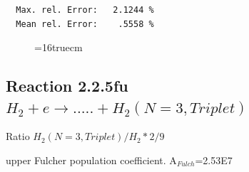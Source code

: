\documentclass[12pt,dvips]{article}
\begin{document}
\begin{small}
\begin{verbatim}
  Max. rel. Error:   2.1244 %
  Mean rel. Error:    .5558 %

\end{verbatim}\end{small}
\begin{figure} \label{2.2.5fl}
\epsfxsize=16truecm
\end{figure}
\newpage

\subsection{
Reaction 2.2.5fu $H_2 + e \rightarrow .....+H_2(N=3,Triplet)$}

Ratio $H_2(N=3, Triplet)/H_2*2/9 $

upper Fulcher population coefficient. A$_{Fulch}$=2.53E7
\end{document}
